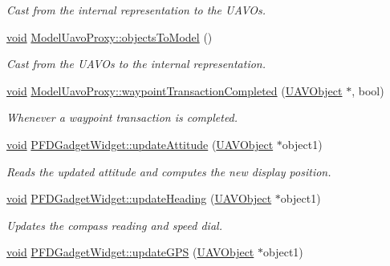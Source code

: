 \begin{DoxyCompactItemize}
\begin{DoxyCompactList}\small\item\em Cast from the internal representation to the U\-A\-V\-Os. \end{DoxyCompactList}\item 
\hyperlink{group___u_a_v_objects_plugin_ga444cf2ff3f0ecbe028adce838d373f5c}{void} \hyperlink{group___o_p_map_plugin_gadf2e7f7ca1a0ae5d380c107e7dbf9132}{Model\-Uavo\-Proxy\-::objects\-To\-Model} ()
\begin{DoxyCompactList}\small\item\em Cast from the U\-A\-V\-Os to the internal representation. \end{DoxyCompactList}\item 
\hyperlink{group___u_a_v_objects_plugin_ga444cf2ff3f0ecbe028adce838d373f5c}{void} \hyperlink{group___o_p_map_plugin_ga428d73f0e25b47749d707e5c6bd5d34f}{Model\-Uavo\-Proxy\-::waypoint\-Transaction\-Completed} (\hyperlink{class_u_a_v_object}{U\-A\-V\-Object} $\ast$, bool)
\begin{DoxyCompactList}\small\item\em Whenever a waypoint transaction is completed. \end{DoxyCompactList}\item 
\hyperlink{group___u_a_v_objects_plugin_ga444cf2ff3f0ecbe028adce838d373f5c}{void} \hyperlink{group___o_p_map_plugin_ga3cedb8f54fcd0c4662e91b56c6043fc2}{P\-F\-D\-Gadget\-Widget\-::update\-Attitude} (\hyperlink{class_u_a_v_object}{U\-A\-V\-Object} $\ast$object1)
\begin{DoxyCompactList}\small\item\em Reads the updated attitude and computes the new display position. \end{DoxyCompactList}\item 
\hyperlink{group___u_a_v_objects_plugin_ga444cf2ff3f0ecbe028adce838d373f5c}{void} \hyperlink{group___o_p_map_plugin_ga4d4bf76026c83f20e97e02adb4cf46f7}{P\-F\-D\-Gadget\-Widget\-::update\-Heading} (\hyperlink{class_u_a_v_object}{U\-A\-V\-Object} $\ast$object1)
\begin{DoxyCompactList}\small\item\em Updates the compass reading and speed dial. \end{DoxyCompactList}\item 
\hyperlink{group___u_a_v_objects_plugin_ga444cf2ff3f0ecbe028adce838d373f5c}{void} \hyperlink{group___o_p_map_plugin_ga469cc6075704bce32507f7561422a3ff}{P\-F\-D\-Gadget\-Widget\-::update\-G\-P\-S} (\hyperlink{class_u_a_v_object}{U\-A\-V\-Object} $\ast$object1)

\end{DoxyCompactItemize}
